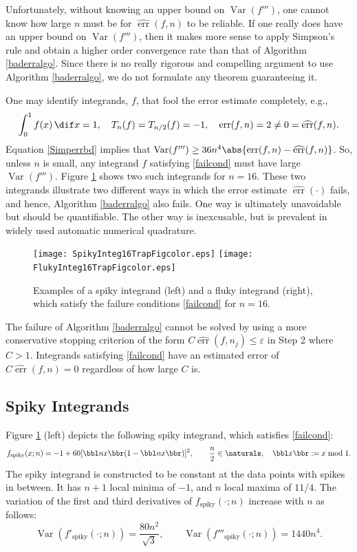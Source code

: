 \documentclass[]{article}
\DeclareMathOperator{\Var}{Var}
\DeclareMathOperator{\err}{err}
\newcommand{\herr}{\widehat{\err}}
\theoremstyle{definition}
\theoremstyle{remark}
\begin{document}
Unfortunately, without knowing an upper bound on $\Var(f''')$, one cannot know how large $n$ must be for $\herr(f,n)$ to be reliable.  If one really does have an upper bound on $\Var(f''')$, then it makes more sense to apply Simpson's rule and obtain a higher order convergence rate than that of Algorithm \ref{baderralgo}.  Since there is no really rigorous and compelling argument to use Algorithm \ref{baderralgo}, we do not formulate any theorem guaranteeing it.

One may identify integrands, $f$, that fool the error estimate completely, e.g.,
\begin{equation} \label{failcond}
\int_0^1 f(x) \, \dif x =  1, \quad T_{n}(f)=T_{n/2}(f) = -1, \quad \err(f,n)=2 \ne 0 = \herr(f,n).
\end{equation}
Equation \eqref{Simperrbd} implies that $\Var(f''') \ge 36 n^4 \abs{\err(f,n) - \herr(f,n)}$.  So, unless $n$ is small, any integrand $f$ satisfying \eqref{failcond} must have large  $\Var(f''')$.  Figure \ref{spikeflukefig} shows two such integrands for $n=16$. These two integrands illustrate two different ways in which the error estimate $\herr(\cdot)$ fails, and hence, Algorithm \ref{baderralgo} also fails.  One way is ultimately unavoidable but should be quantifiable.  The other way is inexcusable, but is prevalent in widely used automatic numerical quadrature.

\begin{figure}
\centering 
\texttt{[image: SpikyInteg16TrapFigcolor.eps]} \qquad
\texttt{[image: FlukyInteg16TrapFigcolor.eps]}
\caption{Examples of a spiky integrand (left) and a fluky integrand (right), which satisfy the failure conditions \eqref{failcond} for $n=16$. \label{spikeflukefig}}
\end{figure}

The failure of Algorithm \ref{baderralgo} cannot be solved by using a more conservative stopping criterion of the form $C\herr(f,n_j) \le \varepsilon$ in Step 2 where $C>1$.  Integrands satisfying \eqref{failcond} have an estimated error of $C\herr(f,n)=0$ regardless of how large $C$ is.

\subsection{Spiky Integrands} 

Figure \ref{spikeflukefig} (left) depicts the following spiky integrand, which satisfies \eqref{failcond}:
\begin{equation} \label{spiky}
f_{\text{spiky}}(x;n) = -1 + 60[\bbl nx \bbr(1-\bbl nx \bbr)]^2, \qquad \frac n2 \in \naturals, \quad \bbl x \bbr := x \bmod 1.
\end{equation}
The spiky integrand is constructed to be constant at the data points with spikes in between.  It has  $n+1$ local minima of $-1$, and $n$ local maxima of $11/4$.
The variation of the first and third derivatives of $f_{\text{spiky}}(\cdot;n)$ increase with $n$ as follows:
\begin{equation*}
\Var(f'_{\text{spiky}}(\cdot;n))= \frac{80n^2}{\sqrt{3}}, \qquad \Var(f'''_{\text{spiky}}(\cdot;n))= 1440n^4.
\end{equation*}
\end{document}
